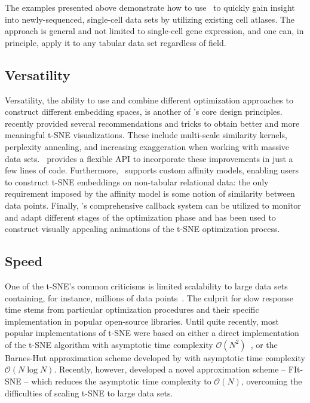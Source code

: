 \documentclass[article]{jss}
\newcommand{\opentsne}{\pkg{openTSNE}}
\begin{document}
The examples presented above demonstrate how to use \opentsne\ to quickly gain
insight into newly-sequenced, single-cell data sets by utilizing existing cell
atlases. The approach is general and not limited to single-cell gene expression,
and one can, in principle, apply it to any tabular data set regardless of field.

\subsection{Versatility}

Versatility, the ability to use and combine different optimization approaches to
construct different embedding spaces, is another of \opentsne's core design
principles. \citet{kobak2019art} recently provided several recommendations and
tricks to obtain better and more meaningful t-SNE visualizations. These include
multi-scale similarity kernels, perplexity annealing, and increasing
exaggeration when working with massive data sets. \opentsne\ provides a flexible
API to incorporate these improvements in just a few lines of code. Furthermore,
\opentsne\ supports custom affinity models, enabling users to construct t-SNE
embeddings on non-tabular relational data: the only requirement imposed by the
affinity model is some notion of similarity between data points. Finally,
\opentsne's comprehensive callback system can be utilized to monitor and adapt
different stages of the optimization phase and has been used to construct
visually appealing animations of the t-SNE optimization process.

\subsection{Speed}

One of the t-SNE's common criticisms is limited scalability to large data sets containing, for instance, millions of data points~\citep {becht2019dimensionality}. The culprit for slow response time stems from particular optimization procedures and their specific implementation in popular open-source libraries. Until quite recently, most popular implementations of t-SNE were based on either a direct implementation of the t-SNE algorithm with asymptotic time complexity $\mathcal{O}(N^2)$~\citep{maaten2008visualizing}, or the Barnes-Hut approximation scheme developed by \citet{van2014accelerating} with asymptotic time complexity $\mathcal{O}(N \log N)$. Recently, however, \citet{linderman2019fast} developed a novel approximation scheme -- FIt-SNE -- which reduces the asymptotic time complexity to $\mathcal {O}(N)$, overcoming the difficulties of scaling t-SNE to large data sets.
\end{document}
